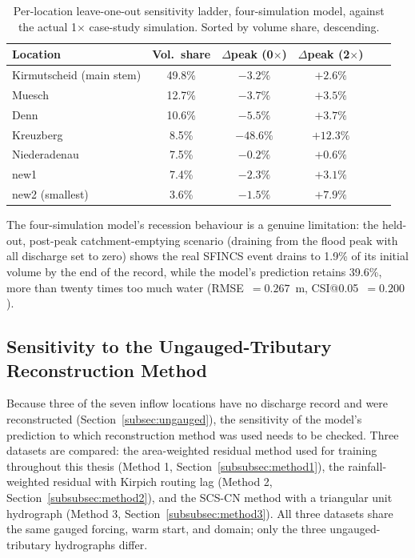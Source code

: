\documentclass[12pt,a4paper]{report}
\begin{document}
{\begin{table}[H]
  \centering
  \caption{Per-location leave-one-out sensitivity ladder, four-simulation model, against the actual 1$\times$ case-study simulation.
    Sorted by volume share, descending.}
  \label{tab:foursim-ladder}
  \begin{tabular}{lccccc}
    \toprule
    Location & Vol.\ share & $\Delta$peak (0$\times$) & $\Delta$peak (2$\times$)  \\
    \midrule
    Kirmutscheid (main stem) & 49.8\% & $-3.2\%$  & $+2.6\%$  \\
    Muesch                   & 12.7\% & $-3.7\%$  & $+3.5\%$  \\
    Denn                     & 10.6\% & $-5.5\%$  & $+3.7\%$ \\
    Kreuzberg                & 8.5\%  & $-48.6\%$ & $+12.3\%$ \\
    Niederadenau              & 7.5\%  & $-0.2\%$  & $+0.6\%$ \\
    new1                     & 7.4\%  & $-2.3\%$  & $+3.1\%$ \\
    new2 (smallest)          & 3.6\%  & $-1.5\%$  & $+7.9\%$ \\
    \bottomrule
  \end{tabular}
\end{table}
 
The four-simulation model's recession behaviour is a genuine limitation: the
held-out, post-peak catchment-emptying scenario (draining from the flood peak with
all discharge set to zero) shows the real SFINCS event drains to 1.9\% of its
initial volume by the end of the record, while the model's prediction retains
39.6\%, more than twenty times too much water (RMSE~$=0.267$~m, CSI@0.05~$=0.200$). 

 
\subsection{Sensitivity to the Ungauged-Tributary Reconstruction Method}
\label{subsec:res_four_sim_bc_method}
 
Because three of the seven inflow locations have no discharge record and were
reconstructed (Section~\ref{subsec:ungauged}), the sensitivity of the model's
prediction to which reconstruction method was used needs to be checked. Three
datasets are compared: the area-weighted residual method used for
training throughout this thesis (Method 1, Section~\ref{subsubsec:method1}), the
rainfall-weighted residual with Kirpich routing lag (Method 2,
Section~\ref{subsubsec:method2}), and the SCS-CN method with a triangular unit
hydrograph (Method 3, Section~\ref{subsubsec:method3}). All three datasets share the
same gauged forcing, warm start, and domain; only the three ungauged-tributary
hydrographs differ.
 
}
\end{document}
